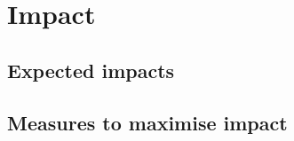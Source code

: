 \chapter{Impact}\label{chap:impact}

\section{Expected impacts}\label{sec:expected-impact}



\section{Measures to maximise impact}




